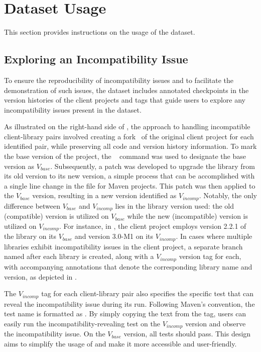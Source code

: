 \section{Dataset Usage}\label{sec:usage-compsuite}

This section provides instructions on the usage of the dataset.

\subsection{Exploring an Incompatibility Issue}\label{sec:isolate-compsuite}
To ensure the reproducibility of incompatibility issues and to
facilitate the demonstration of such issues, the dataset includes annotated checkpoints in the version histories of the client projects and tags that guide users to explore any incompatibility issues
present in the \toolcompsuite dataset.

As illustrated on the right-hand side of , the
approach to handling incompatible client-library pairs involved
creating a fork~\cite{gitfork} of the original client project for each
identified pair, while preserving all code and version history
information. To mark the base version of the project, the ~\cite{gittag} command was used to designate the base version as $V_{base}$. Subsequently, a patch was developed to upgrade the library from its old version to its new version,
a simple process that can be accomplished with a single line change in
the  file for Maven projects. This patch was then
applied to the $V_{base}$ version, resulting in a new version identified as $V_{incomp}$. Notably, the only difference between
$V_{base}$ and $V_{incomp}$ lies in the library version used: the old
(compatible) version is utilized on $V_{base}$ while the new
(incompatible) version is utilized on $V_{incomp}$. For instance, in
, the client project employs version 2.2.1 of
the  library on its $V_{base}$ and
version 3.0-M1 on its $V_{incomp}$. In cases where multiple libraries
exhibit incompatibility issues in the client project, a separate branch named after each library is created, along with a $V_{incomp}$ version tag for each, with accompanying annotations that
denote the corresponding library name and version, as depicted in
.


The $V_{incomp}$ tag for each client-library pair also specifies the
specific test that can reveal the incompatibility issue during its
run. Following Maven's convention, the test name is formatted as
. By simply copying the text from
the tag, users can easily run the incompatibility-revealing test on
the $V_{incomp}$ version and observe the incompatibility issue. On the
$V_{base}$ version, all tests should pass. This design aims to
simplify the usage of \toolcompsuite and make it more accessible and
user-friendly.



